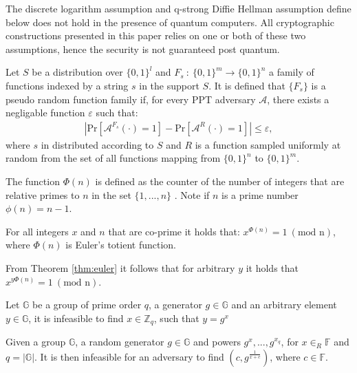 The discrete logarithm assumption and q-strong Diffie Hellman assumption define below does not hold in the presence of quantum computers. All cryptographic constructions presented in this paper relies on one or both of these two assumptions, hence the security is not guaranteed post quantum. 
\vspace{10pt}
\begin{Mydef}
Let $S$ be a  distribution over $\{0,1\}^l$ and $F_s\: :\: \{0,1\}^m\to\{0,1\}^n$ a family of functions indexed by a string $s$ in the support $S$. It is defined that $\{F_s\}$ is a pseudo random function family if, for every PPT adversary $\mathcal{A}$, there exists a negligable function $\varepsilon$ such that:
\begin{align*}
|\text{Pr}[\mathcal{A}^{F_s}(\cdot) = 1] - \text{Pr}[\mathcal{A}^{R}(\cdot) = 1] | \leq \varepsilon,
\end{align*}
where $s$ in distributed according to $S$ and $R$ is a function sampled uniformly at random from the set of all functions mapping from $\{0,1\}^n$ to $\{0,1\}^m$.
\end{Mydef}
\vspace{10pt}
\begin{Mydef}
The function $\Phi(n)$ is defined as the counter of the number of integers that are relative primes to $n$ in the set $\{1,...,n\}$ . Note if $n$ is a prime number $\phi(n) = n-1$.
\end{Mydef}
\vspace{10pt}
\begin{thm}
\label{thm:euler}
For all integers $x$ and $n$ that are co-prime it holds that:
$x^{\Phi(n)} = 1\:( \text{mod n})$, where $\Phi(n)$ is Euler's totient function.
\end{thm}
\vspace{10pt}
From Theorem \ref{thm:euler} it follows that for arbitrary $y$ it holds that $x^{y\Phi(n)} = 1 \:( \text{mod n})$.
\vspace{10pt}

\begin{Ass}
\label{ass:DLA}
Let $\mathds{G}$ be a group of prime order $q$, a generator $g\in \mathds{G}$ and an arbitrary element $y \in\mathds{G}$, it is  infeasible to find $x \in \mathds{Z}_q$, such that $y=g^x$
\end{Ass}

\vspace{10pt}
\begin{Ass}
 Given a group $\mathds{G}$, a random generator $g\in \mathds{G}$ and powers $g^x,...,g^{x_q}$, for $x \in_R \mathds{F}$ and  $q= |\mathds{G}|$. It is then  infeasible for an adversary to find $(c, g^{\frac{1}{x+c}})$, where $c \in \mathds{F}$.
\end{Ass}




